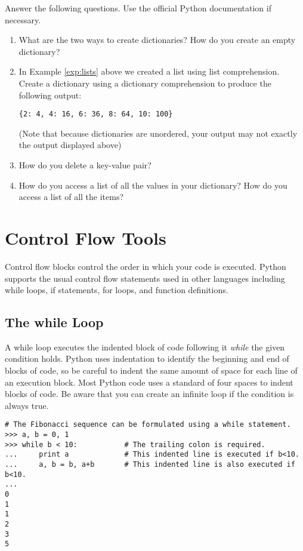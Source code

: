 \begin{problem}
Answer the following questions. Use the official Python documentation if necessary.
\begin{enumerate}
\item What are the two ways to create dictionaries? How do you create an empty dictionary?
\item In Example \ref{exp:lists} above we created a list using list comprehension. Create a dictionary using a dictionary comprehension to produce the following output:

\begin{lstlisting}
{2: 4, 4: 16, 6: 36, 8: 64, 10: 100}
\end{lstlisting}

(Note that because dictionaries are unordered, your output may not exactly the output displayed above)
\item How do you delete a key-value pair?
\item How do you access a list of all the values in your dictionary?  
How do you access a list of all the items?
\end{enumerate}
\end{problem}


\section*{Control Flow Tools}
Control flow blocks control the order in which your code is executed.
Python supports the usual control flow statements used in other languages
including while loops, if statements, for loops, and function definitions. 

\subsection*{The while Loop}
\begin{example}
A while loop executes the indented block of code following it \emph{while} the given condition holds. Python uses indentation to identify the beginning and end of blocks of code, so be careful to indent the same amount of space for each line of an execution block.
Most Python code uses a standard of four spaces to indent blocks of code.
Be aware that you can create an infinite loop if the condition is always true.

\begin{lstlisting}
# The Fibonacci sequence can be formulated using a while statement. 
>>> a, b = 0, 1
>>> while b < 10:           # The trailing colon is required.
...     print a             # This indented line is executed if b<10.
...     a, b = b, a+b       # This indented line is also executed if b<10.
...     
0
1
1
2
3
5
\end{lstlisting}
\end{example}

